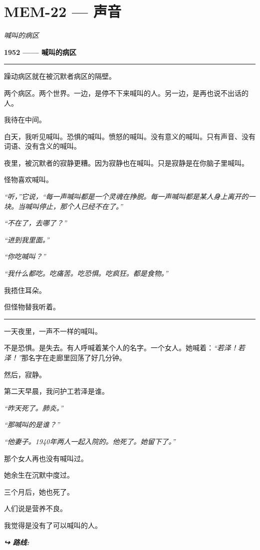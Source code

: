 \section*{\textbf{MEM-22} --- 声音}

\noindent \textit{喊叫的病区}

\noindent \textbf{1952 —— 喊叫的病区}

\vspace{0.5em}\noindent\rule{\textwidth}{0.5pt}\vspace{0.5em}

\noindent 躁动病区就在被沉默者病区的隔壁。

\noindent 两个病区。两个世界。一边，是停不下来喊叫的人。另一边，是再也说不出话的人。

\noindent 我待在中间。

\noindent 白天，我听见喊叫。恐惧的喊叫。愤怒的喊叫。没有意义的喊叫。只有声音、没有词语、没有含义的喊叫。

\noindent 夜里，被沉默者的寂静更糟。因为寂静也在喊叫。只是寂静是在你脑子里喊叫。

\noindent 怪物喜欢喊叫。

\noindent \textit{“听，”它说，“每一声喊叫都是一个灵魂在挣脱。每一声喊叫都是某人身上离开的一块。当喊叫停止，那个人已经不在了。”}

\noindent \textit{“不在了，去哪了？”}

\noindent \textit{“进到我里面。”}

\noindent \textit{“你吃喊叫？”}

\noindent \textit{“我什么都吃。吃痛苦。吃恐惧。吃疯狂。都是食物。”}

\noindent 我捂住耳朵。

\noindent 但怪物替我听着。

\vspace{0.5em}\noindent\rule{\textwidth}{0.5pt}\vspace{0.5em}

\noindent 一天夜里，一声不一样的喊叫。

\noindent 不是恐惧。是失去。有人呼喊着某个人的名字。一个女人。她喊着：\textit{“若泽！若泽！”}那名字在走廊里回荡了好几分钟。

\noindent 然后，寂静。

\noindent 第二天早晨，我问护工若泽是谁。

\noindent \textit{“昨天死了。肺炎。”}

\noindent \textit{“那喊叫的是谁？”}

\noindent \textit{“他妻子。1940年两人一起入院的。他死了。她留下了。”}

\noindent 那个女人再也没有喊叫过。

\noindent 她余生在沉默中度过。

\noindent 三个月后，她也死了。

\noindent 人们说是营养不良。

\noindent 我觉得是没有了可以喊叫的人。

\vspace{0.5em}
\noindent\textit{\textbf{↪ 路线:}  \rotasep {}}
